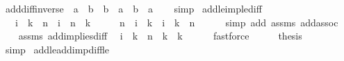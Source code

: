 \begin{isabellebody}
\endisatagproof
{\isafoldproof}%
%
\isadelimproof
\isanewline
%
\endisadelimproof
\isanewline
{}\isamarkupfalse%
\ add{\isacharunderscore}{\kern0pt}diff{\isacharunderscore}{\kern0pt}inverse{\isacharcolon}{\kern0pt}\ {\isachardoublequoteopen}{\isasymnot}\ a\ {\isacharless}{\kern0pt}\ b\ {\isasymLongrightarrow}\ b\ {\isacharplus}{\kern0pt}\ {\isacharparenleft}{\kern0pt}a\ {\isacharminus}{\kern0pt}\ b{\isacharparenright}{\kern0pt}\ {\isacharequal}{\kern0pt}\ a{\isachardoublequoteclose}\isanewline
%
\isadelimproof
\ \ %
\endisadelimproof
%
\isatagproof
{}\isamarkupfalse%
\ simp%
\endisatagproof
{\isafoldproof}%
%
\isadelimproof
\isanewline
%
\endisadelimproof
\isanewline
{}\isamarkupfalse%
\ add{\isacharunderscore}{\kern0pt}le{\isacharunderscore}{\kern0pt}imp{\isacharunderscore}{\kern0pt}le{\isacharunderscore}{\kern0pt}diff{\isacharcolon}{\kern0pt}\ \isanewline
\ \ \ {\isachardoublequoteopen}i\ {\isacharplus}{\kern0pt}\ k\ {\isasymle}\ n{\isachardoublequoteclose}\ \ {\isachardoublequoteopen}i\ {\isasymle}\ n\ {\isacharminus}{\kern0pt}\ k{\isachardoublequoteclose}\isanewline
%
\isadelimproof
%
\endisadelimproof
%
\isatagproof
{}\isamarkupfalse%
\ {\isacharminus}{\kern0pt}\isanewline
\ \ \isamarkupfalse%
\ {\isachardoublequoteopen}n\ {\isacharminus}{\kern0pt}\ {\isacharparenleft}{\kern0pt}i\ {\isacharplus}{\kern0pt}\ k{\isacharparenright}{\kern0pt}\ {\isacharplus}{\kern0pt}\ i\ {\isacharplus}{\kern0pt}\ k\ {\isacharequal}{\kern0pt}\ n{\isachardoublequoteclose}\isanewline
\ \ \ \ \isamarkupfalse%
\ {\isacharparenleft}{\kern0pt}simp\ add{\isacharcolon}{\kern0pt}\ assms\ add{\isachardot}{\kern0pt}assoc{\isacharparenright}{\kern0pt}\isanewline
\ \ \isamarkupfalse%
\ assms\ add{\isacharunderscore}{\kern0pt}implies{\isacharunderscore}{\kern0pt}diff\ \isamarkupfalse%
\ {\isachardoublequoteopen}i\ {\isacharplus}{\kern0pt}\ k\ {\isasymle}\ n\ {\isacharminus}{\kern0pt}\ k\ {\isacharplus}{\kern0pt}\ k{\isachardoublequoteclose}\isanewline
\ \ \ \ \isamarkupfalse%
\ fastforce\isanewline
\ \ \isamarkupfalse%
\ \isamarkupfalse%
\ {\isacharquery}{\kern0pt}thesis\isanewline
\ \ \ \ \isamarkupfalse%
\ simp\isanewline
{}\isamarkupfalse%
%
\endisatagproof
{\isafoldproof}%
%
\isadelimproof
\isanewline
%
\endisadelimproof
\isanewline
{}\isamarkupfalse%
\ add{\isacharunderscore}{\kern0pt}le{\isacharunderscore}{\kern0pt}add{\isacharunderscore}{\kern0pt}imp{\isacharunderscore}{\kern0pt}diff{\isacharunderscore}{\kern0pt}le{\isacharcolon}{\kern0pt}\isanewline

\end{isabellebody}
